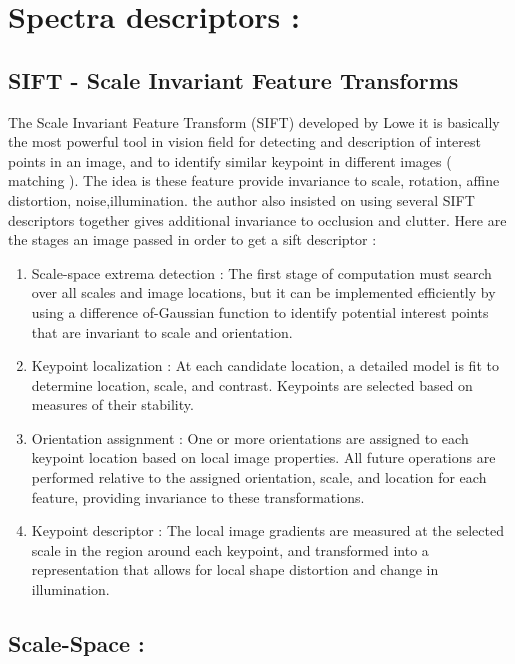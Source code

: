 \section{Spectra descriptors :}
\subsection{SIFT - Scale Invariant Feature Transforms} \label{siftSection}

The Scale Invariant Feature Transform (SIFT) developed by Lowe \cite{lowe}  it is basically the most powerful tool in vision field for detecting and description of interest points in an image, and to identify similar keypoint in different images ( matching ). The idea is these feature provide invariance to scale, rotation, affine distortion, noise,illumination.
the author \cite{lowe} also insisted on using several SIFT descriptors together gives additional invariance to occlusion and clutter. Here are the stages an image passed in order to get a sift descriptor :


\begin{enumerate}
\item Scale-space extrema detection :
The first stage of computation must search over all
scales and image locations, but it can be implemented efficiently by using a difference of-Gaussian
function to identify potential interest points that are invariant to scale and orientation.
\item Keypoint localization :
At each candidate location, a detailed model is fit to determine
location, scale, and contrast. Keypoints are selected based on measures of their
stability.
\item Orientation assignment :
One or more orientations are assigned to each keypoint
location based on local image properties. All future operations are performed relative to the assigned orientation, scale, and location for each feature, providing invariance
to these transformations.
\item Keypoint descriptor  :
The local image gradients are measured at the selected scale
in the region around each keypoint, and transformed into a representation that allows
for local shape distortion and change in illumination.
\end{enumerate}



\subsection{Scale-Space :}

